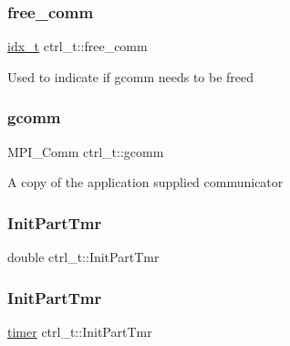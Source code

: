 \mbox{\label{a00742_aab19c0f9f0acd534d86498a9217f95e5}} 
\subsubsection{\texorpdfstring{free\+\_\+comm}{free\_comm}}
{\footnotesize\ttfamily \hyperlink{a00876_aaa5262be3e700770163401acb0150f52}{idx\+\_\+t} ctrl\+\_\+t\+::free\+\_\+comm}

Used to indicate if gcomm needs to be freed \mbox{\label{a00742_aeb4b28f44dc445407a23443c96c85489}} 
\subsubsection{\texorpdfstring{gcomm}{gcomm}}
{\footnotesize\ttfamily M\+P\+I\+\_\+\+Comm ctrl\+\_\+t\+::gcomm}

A copy of the application supplied communicator \mbox{\label{a00742_aaa34977233d81aa867a7dca9fb095747}} 
\subsubsection{\texorpdfstring{Init\+Part\+Tmr}{InitPartTmr}\hspace{0.1cm}{\footnotesize\ttfamily [1/2]}}
{\footnotesize\ttfamily double ctrl\+\_\+t\+::\+Init\+Part\+Tmr}

\mbox{\label{a00742_a1a0b3969ee6948842f7411599747326d}} 
\subsubsection{\texorpdfstring{Init\+Part\+Tmr}{InitPartTmr}\hspace{0.1cm}{\footnotesize\ttfamily [2/2]}}
{\footnotesize\ttfamily \hyperlink{a00978_aae821c36bb7e6918e1414484f939c3d4}{timer} ctrl\+\_\+t\+::\+Init\+Part\+Tmr}

